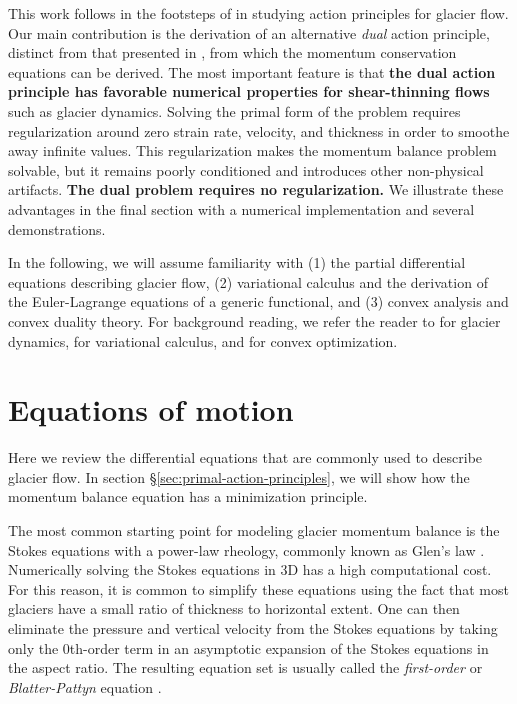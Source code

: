 \documentclass{article}
\theoremstyle{definition}
\theoremstyle{plain}
\begin{document}
This work follows in the footsteps of \citet{dukowicz2010consistent} in studying action principles for glacier flow.
Our main contribution is the derivation of an alternative \emph{dual} action principle, distinct from that presented in \citet{dukowicz2010consistent}, from which the momentum conservation equations can be derived.
The most important feature is that \textbf{the dual action principle has favorable numerical properties for shear-thinning flows} such as glacier dynamics.
Solving the primal form of the problem requires regularization around zero strain rate, velocity, and thickness in order to smoothe away infinite values.
This regularization makes the momentum balance problem solvable, but it remains poorly conditioned and introduces other non-physical artifacts.
\textbf{The dual problem requires no regularization.}
We illustrate these advantages in the final section with a numerical implementation and several demonstrations.

In the following, we will assume familiarity with (1) the partial differential equations describing glacier flow, (2) variational calculus and the derivation of the Euler-Lagrange equations of a generic functional, and (3) convex analysis and convex duality theory.
For background reading, we refer the reader to \citet{greve2009dynamics} for glacier dynamics, \citet{weinstock1974calculus} for variational calculus, and \citet{boyd2004convex} for convex optimization.



\section{Equations of motion}

Here we review the differential equations that are commonly used to describe glacier flow.
In section \S\ref{sec:primal-action-principles}, we will show how the momentum balance equation has a minimization principle.

The most common starting point for modeling glacier momentum balance is the Stokes equations with a power-law rheology, commonly known as Glen's law \citep{glen1958law, greve2009dynamics}.
Numerically solving the Stokes equations in 3D has a high computational cost.
For this reason, it is common to simplify these equations using the fact that most glaciers have a small ratio of thickness to horizontal extent.
One can then eliminate the pressure and vertical velocity from the Stokes equations by taking only the 0th-order term in an asymptotic expansion of the Stokes equations in the aspect ratio.
The resulting equation set is usually called the \emph{first-order} or \emph{Blatter-Pattyn} equation \citep{greve2009dynamics}.
\end{document}
